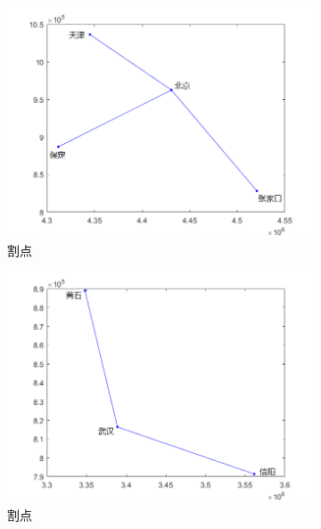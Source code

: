 \documentclass{article}
\begin{document}
\begin{figure}[htpb]
	\centering
	\begin{subfigure}[htpb]{.31\linewidth}
		\centering
		\includegraphics[width=\linewidth]{210.png}
		\caption{割点}
		\label{fig:割点\chinese{subfigure}\arabic{subsection}}
	\end{subfigure}
	\quad
	\begin{subfigure}[htpb]{.31\linewidth}
		\centering
		\includegraphics[width=\linewidth]{220.png}
		\caption{割点}
		\label{fig:割点\chinese{subfigure}\arabic{subsection}}
	\end{subfigure}
	\quad
	\begin{subfigure}[htpb]{.31\linewidth}

\end{subfigure}
\end{figure}
\end{document}
